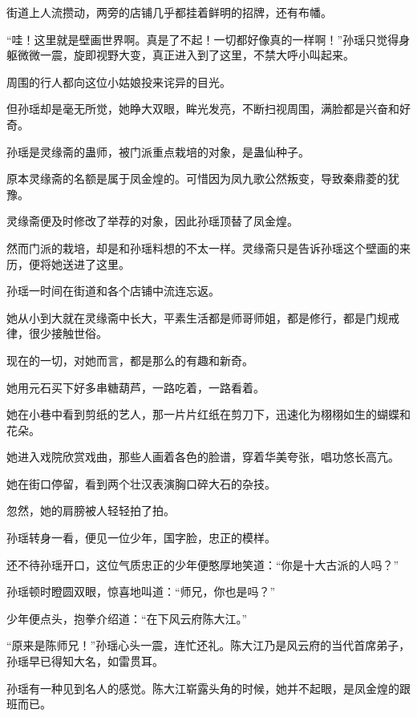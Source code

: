 
\begin{this_body}



街道上人流攒动，两旁的店铺几乎都挂着鲜明的招牌，还有布幡。

“哇！这里就是壁画世界啊。真是了不起！一切都好像真的一样啊！”孙瑶只觉得身躯微微一震，旋即视野大变，真正进入到了这里，不禁大呼小叫起来。

周围的行人都向这位小姑娘投来诧异的目光。

但孙瑶却是毫无所觉，她睁大双眼，眸光发亮，不断扫视周围，满脸都是兴奋和好奇。

孙瑶是灵缘斋的蛊师，被门派重点栽培的对象，是蛊仙种子。

原本灵缘斋的名额是属于凤金煌的。可惜因为凤九歌公然叛变，导致秦鼎菱的犹豫。

灵缘斋便及时修改了举荐的对象，因此孙瑶顶替了凤金煌。

然而门派的栽培，却是和孙瑶料想的不太一样。灵缘斋只是告诉孙瑶这个壁画的来历，便将她送进了这里。

孙瑶一时间在街道和各个店铺中流连忘返。

她从小到大就在灵缘斋中长大，平素生活都是师哥师姐，都是修行，都是门规戒律，很少接触世俗。

现在的一切，对她而言，都是那么的有趣和新奇。

她用元石买下好多串糖葫芦，一路吃着，一路看着。

她在小巷中看到剪纸的艺人，那一片片红纸在剪刀下，迅速化为栩栩如生的蝴蝶和花朵。

她进入戏院欣赏戏曲，那些人画着各色的脸谱，穿着华美夸张，唱功悠长高亢。

她在街口停留，看到两个壮汉表演胸口碎大石的杂技。

忽然，她的肩膀被人轻轻拍了拍。

孙瑶转身一看，便见一位少年，国字脸，忠正的模样。

还不待孙瑶开口，这位气质忠正的少年便憨厚地笑道：“你是十大古派的人吗？”

孙瑶顿时瞪圆双眼，惊喜地叫道：“师兄，你也是吗？”

少年便点头，抱拳介绍道：“在下风云府陈大江。”

“原来是陈师兄！”孙瑶心头一震，连忙还礼。陈大江乃是风云府的当代首席弟子，孙瑶早已得知大名，如雷贯耳。

孙瑶有一种见到名人的感觉。陈大江崭露头角的时候，她并不起眼，是凤金煌的跟班而已。


\end{this_body}
